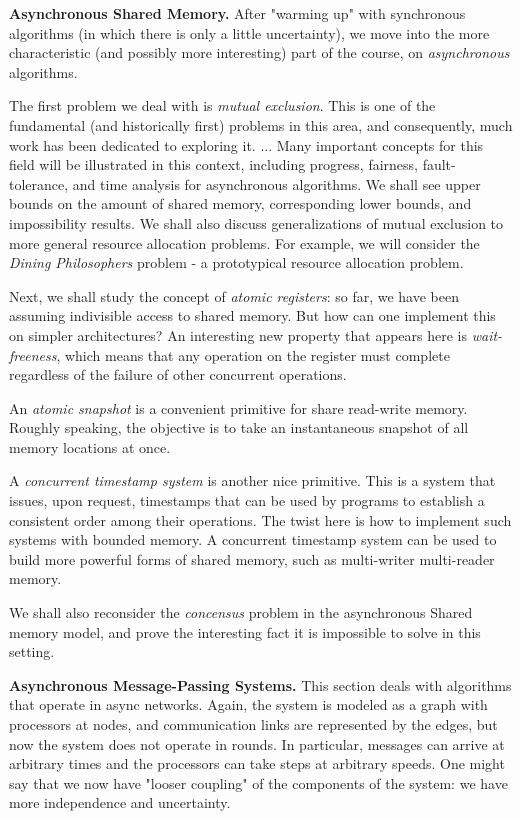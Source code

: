 \documentclass{report}
\theoremstyle{plain}
\theoremstyle{definition}
\theoremstyle{remark}
\begin{document}
\noindent \textbf{Asynchronous Shared Memory.} After "warming up" with synchronous
algorithms (in which there is only a little uncertainty), we move into the more
characteristic (and possibly more interesting) part of the course, on 
\textit{asynchronous} algorithms. 

The first problem we deal with is \textit{mutual exclusion}. This is one of the 
fundamental (and historically first) problems in this area, and consequently, 
much work has been dedicated to exploring it. ... 
Many important concepts for this field will be illustrated in this context, 
including progress, fairness, fault-tolerance, and time analysis for asynchronous
algorithms. We shall see upper bounds on the amount of shared memory, corresponding
lower bounds, and impossibility results. We shall also discuss generalizations 
of mutual exclusion to more general resource allocation problems. For example, 
we will consider the \textit{Dining Philosophers} problem - a prototypical 
resource allocation problem. 

Next, we shall study the concept of \textit{atomic registers}: so far, we 
have been assuming indivisible access to shared memory. But how can one 
implement this on simpler architectures? An interesting new property that appears
here is \textit{wait-freeness}, which means that any operation on the register
must complete regardless of the failure of other concurrent operations. 

An \textit{atomic snapshot} is a convenient primitive for share read-write memory. 
Roughly speaking, the objective is to take an instantaneous snapshot of all memory 
locations at once. 

A \textit{concurrent timestamp system} is another nice primitive. This is a system
that issues, upon request, timestamps that can be used by programs to establish 
a consistent order among their operations. The twist here is how to implement 
such systems with bounded memory. A concurrent timestamp system can be used to 
build more powerful forms of shared memory, such as multi-writer multi-reader memory. 

We shall also reconsider the \textit{concensus} problem in the asynchronous Shared
memory model, and prove the interesting fact it is impossible to solve in this setting. 

\noindent \textbf{Asynchronous Message-Passing Systems.} This section deals with 
algorithms that operate in async networks. Again, the system is modeled as a graph
with processors at nodes, and communication links are represented by the edges, 
but now the system does not operate in rounds. In particular, messages can arrive
at arbitrary times and the processors can take steps at arbitrary speeds. One might
say that we now have "looser coupling" of the components of the system: we have
more independence and uncertainty. 
\end{document}
